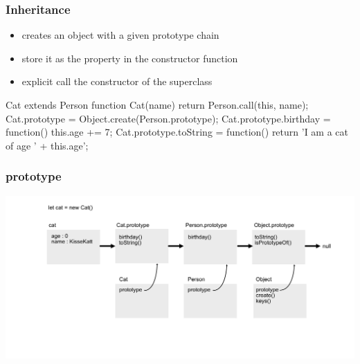 \begin{frame}[fragile] \frametitle{Inheritance}
\begin{itemize}
  \item {} creates an object with a given prototype chain
  \item store it as the  property in the constructor function
  \item explicit call the constructor of the superclass
\end{itemize}
\vspace{2mm}
\begin{CodeBox}{Cat extends Person}
function Cat(name) {
  return Person.call(this, name);
}
Cat.prototype = Object.create(Person.prototype);
Cat.prototype.birthday = function() { this.age += 7; }
Cat.prototype.toString = function() {
  return 'I am a cat of age ' + this.age';
}
\end{CodeBox}
\end{frame}

\begin{frame}[fragile] \frametitle{prototype}
  \centering
  \includegraphics[width=14cm]{img/prototype_chain5}
\end{frame}

